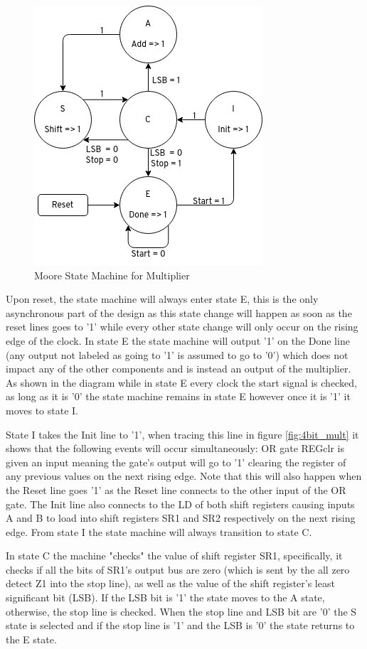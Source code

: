 \documentclass[11pt]{article}
\begin{document}
\begin{figure}[H]        
    \centering
    \includegraphics[width=.33\textwidth]{StateMachine.png}
    \caption{Moore State Machine for Multiplier}
    \label{fig:msm}
\end{figure} 

Upon reset, the state machine will always enter state E,
this is the only asynchronous part of the design as this state change will happen as soon as the reset lines goes to '1' while every other state change will only occur on the rising edge of the clock.
In state E the state machine will output '1' on the Done line (any output not labeled as going to '1' is assumed to go to '0') which does not impact any of the other components and is instead an output of the multiplier.
As shown in the diagram while in state E every clock the start signal is checked, as long as it is '0' the state machine remains in state E however once it is '1' it moves to state I.

State I takes the Init line to '1', when tracing this line in figure \ref{fig:4bit_mult} it shows that the following events will occur simultaneously: OR gate REGclr is given an input meaning the gate's output will go to '1' clearing the register of any previous values on the next rising edge.
Note that this will also happen when the Reset line goes '1' as the Reset line connects to the other input of the OR gate. 
The Init line also connects to the LD of both shift registers causing inputs A and B to load into shift registers SR1 and SR2 respectively on the next rising edge.
From state I the state machine will always transition to state C. 

In state C the machine "checks" the value of shift register SR1,
specifically, it checks if all the bits of SR1's output bus are zero (which is sent by the all zero detect Z1 into the stop line), as well as the value of the shift register's least significant bit (LSB).
If the LSB bit is '1' the state moves to the A state, otherwise, the stop line is checked.
When the stop line and LSB bit are '0' the S state is selected and if the stop line is '1' and the LSB is '0' the state returns to the E state.
\end{document}
